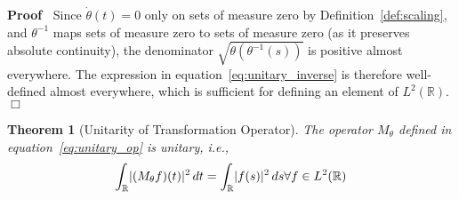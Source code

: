 \documentclass{article}
\newenvironment{proof}{\noindent\textbf{Proof\ }}{\hspace*{\fill}$\Box$\medskip}
\newtheorem{theorem}{Theorem}
\begin{document}
\begin{proof}
  Since $\dot{\theta} (t) = 0$ only on sets of measure zero by
  Definition~\ref{def:scaling}, and $\theta^{- 1}$ maps sets of measure zero
  to sets of measure zero (as it preserves absolute continuity), the
  denominator $\sqrt{\dot{\theta} (\theta^{- 1} (s))}$ is positive almost
  everywhere. The expression in equation~\eqref{eq:unitary_inverse} is
  therefore well-defined almost everywhere, which is sufficient for defining
  an element of $L^2 (\mathbb{R})$.
\end{proof}

\begin{theorem}
  [Unitarity of Transformation Operator]\label{thm:unitary} The operator
  $M_{\theta}$ defined in equation~\eqref{eq:unitary_op} is unitary, i.e.,
  \begin{equation}
    \label{eq:L2_preserve} \int_{\mathbb{R}} \lvert (M_{\theta} f) (t)
    \rvert^2  \hspace{0.17em} dt = \int_{\mathbb{R}} \lvert f (s) \rvert^2 
    \hspace{0.17em} ds \forall f \in L^2 (\mathbb{R})
  \end{equation}
\end{theorem}
\end{document}
